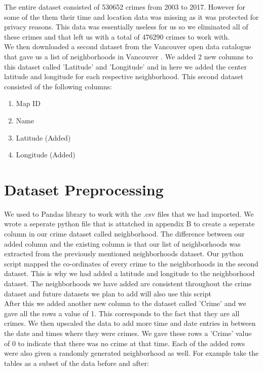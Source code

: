 \documentclass[conference]{IEEEtran}
\begin{document}
    The entire dataset consisted of 530652 crimes from 2003 to 2017. However for some of the them
    their time and location data was missing as it was protected for privacy reasons.
    This data was essentially useless for us so we eliminated all of these crimes and
    that left us with a total of 476290 crimes to work with.\\
    
    We then downloaded a second dataset from the Vancouver open data catalogue that
    gave us a list of neighborhoods in Vancouver \cite{DT_N}. We added 2 new columns
    to this dataset called 'Latitude' and 'Longitude' and in here we added the center
    latitude and longitude for each respective neighborhood. This second dataset
    consisted of the following columns:\\

    \begin{enumerate}
        \item Map ID
        \item Name
        \item Latitude (Added)
        \item Longitude (Added)\\
    \end{enumerate}

    \section{Dataset Preprocessing}

    We used to Pandas library to work with the .csv files that we had imported. We wrote a seperate
    python file that is attatched in appendix B to create a seperate column in our crime dataset called
    neighborhood. The difference between our added column and the existing column is that our list of neighborhoods
    was extracted from the previously mentioned neighborhoods dataset. Our python script mapped the co-ordinates of every crime
    to the neighborhoods in the second dataset. This is why we had added a latitude and longitude to the neighborhood dataset.
    The neighborhoods we have added are consistent throughout the crime dataset and future datasets we plan to add will also use this
    script\\

    After this we added another new column to the dataset called 'Crime' and we gave all the rows a value
    of 1. This corresponds to the fact that they are all crimes. We then upscaled the data
    to add more time and date entries in between the date and times where they were crimes.
    We gave these rows a 'Crime' value of 0 to indicate that there was no crime at that
    time. Each of the added rows were also given a randomly generated neighborhood as well.
    For example take the tables as a subset of the data before and after:
\end{document}
